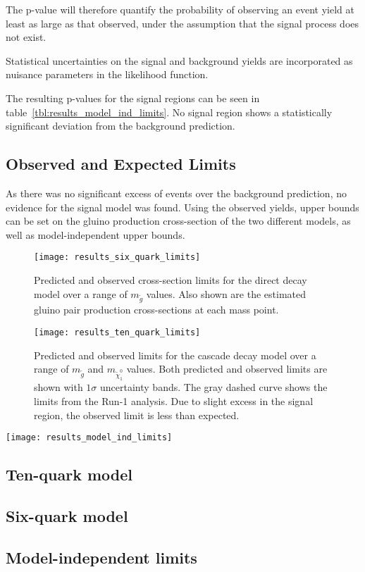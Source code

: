 The p-value will therefore quantify the probability of observing an event yield at least as large as that observed,
under the assumption that the signal process does not exist.

Statistical uncertainties on the signal and background yields are incorporated as nuisance parameters in the likelihood
function.

The resulting p-values for the signal regions can be seen in table~\ref{tbl:results_model_ind_limits}.
No signal region shows a statistically significant deviation from the background prediction.

\subsection{Observed and Expected Limits}\label{subsec:results_limits}

As there was no significant excess of events over the background prediction, no evidence for the signal model was found.
Using the observed yields, upper bounds can be set on the gluino production cross-section of the two different
models, as well as model-independent upper bounds.



\begin{figure}[!ht]
    \centering
    \texttt{[image: results\_six\_quark\_limits]}
    \caption{Predicted and observed cross-section limits for the direct decay model over a range of $m_{\tilde{g}}$
    values.
    Also shown are the estimated gluino pair production cross-sections at each mass point.}
\label{fig:results_six_quark_limits}
\end{figure}

\begin{figure}[!ht]
    \centering
    \texttt{[image: results\_ten\_quark\_limits]}
    \caption{Predicted and observed limits for the cascade decay model over a range of $m_{\tilde{g}}$
and $m_{\tilde{\chi}_1^0}$ values.
    Both predicted and observed limits are shown with $1\sigma$ uncertainty bands.
    The gray dashed curve shows the limits from the Run-1 analysis.
    Due to slight excess in the signal region, the observed limit is less than expected.}
\label{fig:results_ten_quark_limits}
\end{figure}

\begin{table}[!ht]
    \centering
    \texttt{[image: results\_model\_ind\_limits]}
    \caption{}
\label{tbl:results_model_ind_limits}
\end{table}

\subsection{Ten-quark model}\label{subsec:results_limits_ten_quark}
\subsection{Six-quark model}\label{subsec:results_limits_six_quark}
\subsection{Model-independent limits}\label{subsec:results_limits_model_independent}